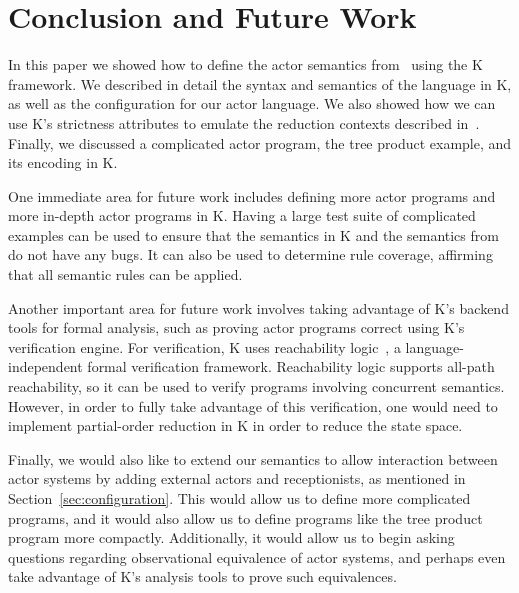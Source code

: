 \documentclass{llncs}
\begin{document}
\section{Conclusion and Future Work}

In this paper we showed how to define the actor semantics from~\cite{} using the
K framework. We described in detail the syntax and semantics of the language in
K, as well as the configuration for our actor language. We also showed how we
can use K's strictness attributes to emulate the reduction contexts described
in~\cite{}. Finally, we discussed a complicated actor program, the tree product
example, and its encoding in K.

One immediate area for future work includes defining more actor programs and
more in-depth actor programs in K. Having a large test suite of complicated
examples can be used to ensure that the semantics in K and the semantics
from~\cite{} do not have any bugs. It can also be used to determine rule
coverage, affirming that all semantic rules can be applied.

Another important area for future work involves taking advantage of K's
backend tools for formal analysis, such as proving actor programs correct using
K's verification engine. For verification, K uses reachability logic~\cite{}, a
language-independent formal verification framework. Reachability logic supports
all-path reachability, so it can be used to verify programs involving concurrent
semantics. However, in order to fully take advantage of this verification, one
would need to implement partial-order reduction in K in order to reduce the
state space.

Finally, we would also like to extend our semantics to allow interaction between
actor systems by adding external actors and receptionists, as mentioned in
Section~\ref{sec:configuration}. This would allow us to define more complicated
programs, and it would also allow us to define programs like the tree product
program more compactly. Additionally, it would allow us to begin asking
questions regarding observational equivalence of actor systems, and perhaps even
take advantage of K's analysis tools to prove such equivalences.

%
%



\end{document}
